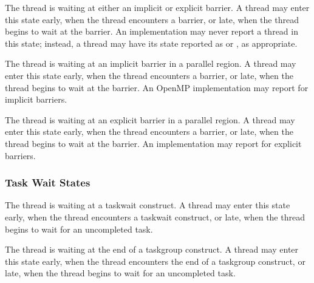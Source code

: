 \begin{description}

  \item {} 
  
  \sloppy
  The thread is waiting at either an implicit or explicit barrier.
  A thread may enter this state
  early, when the thread encounters a barrier, or late, when the
  thread begins to wait at the barrier. An implementation may never report a thread in this state; instead, a thread may have its state reported
  as   or , as appropriate.
  
  \item {} 
  
  \sloppy
  The thread is waiting at an implicit barrier in a parallel region. 
  A  thread may enter this state
  early, when the thread encounters a barrier, or late, when the
  thread begins to wait at the barrier.
  An OpenMP implementation may report  
  for implicit barriers.
  
  \item {} 

  The thread is waiting at an explicit barrier  in a parallel region. 
  A thread may enter this state
  early, when the thread encounters a barrier, or late, when the
  thread begins to wait at the barrier.
  An implementation may report  
  for explicit barriers.
  
\end{description}
  
\subsubsection{Task Wait States}

\begin{description}

\item {} 

  The thread is waiting at a taskwait construct. A 
  thread may enter this state early, when the
  thread encounters a taskwait construct, or late, when the thread
  begins to wait for an uncompleted task.

\item {} 

  The thread is waiting at the end of a taskgroup construct. A 
  thread may enter this state early, when the
  thread encounters the end of a taskgroup construct, or late, when the thread
  begins to wait for an uncompleted task.

\end{description}


